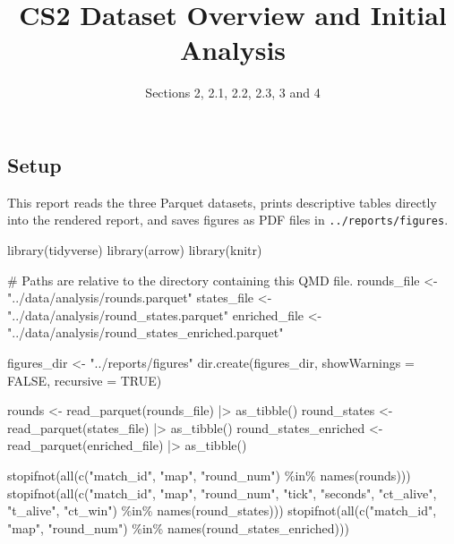 \documentclass[
  letterpaper,
  DIV=11,
  numbers=noendperiod]{scrartcl}
\title{CS2 Dataset Overview and Initial Analysis}
\subtitle{Sections 2, 2.1, 2.2, 2.3, 3 and 4}
\author{}
\date{}
\newenvironment{Shaded}{\begin{snugshade}}{\end{snugshade}}
\newcommand{\AttributeTok}[1]{\textcolor[rgb]{0.40,0.45,0.13}{#1}}
\newcommand{\CommentTok}[1]{\textcolor[rgb]{0.37,0.37,0.37}{#1}}
\newcommand{\ConstantTok}[1]{\textcolor[rgb]{0.56,0.35,0.01}{#1}}
\newcommand{\FunctionTok}[1]{\textcolor[rgb]{0.28,0.35,0.67}{#1}}
\newcommand{\NormalTok}[1]{\textcolor[rgb]{0.00,0.23,0.31}{#1}}
\newcommand{\OtherTok}[1]{\textcolor[rgb]{0.00,0.23,0.31}{#1}}
\newcommand{\SpecialCharTok}[1]{\textcolor[rgb]{0.37,0.37,0.37}{#1}}
\newcommand{\StringTok}[1]{\textcolor[rgb]{0.13,0.47,0.30}{#1}}
\begin{document}
\maketitle


\subsection{Setup}\label{setup}

This report reads the three Parquet datasets, prints descriptive tables
directly into the rendered report, and saves figures as PDF files in
\texttt{../reports/figures}.

\begin{Shaded}
\begin{Highlighting}[]
\FunctionTok{library}\NormalTok{(tidyverse)}
\FunctionTok{library}\NormalTok{(arrow)}
\FunctionTok{library}\NormalTok{(knitr)}

\CommentTok{\# Paths are relative to the directory containing this QMD file.}
\NormalTok{rounds\_file }\OtherTok{\textless{}{-}} \StringTok{"../data/analysis/rounds.parquet"}
\NormalTok{states\_file }\OtherTok{\textless{}{-}} \StringTok{"../data/analysis/round\_states.parquet"}
\NormalTok{enriched\_file }\OtherTok{\textless{}{-}} \StringTok{"../data/analysis/round\_states\_enriched.parquet"}

\NormalTok{figures\_dir }\OtherTok{\textless{}{-}} \StringTok{"../reports/figures"}
\FunctionTok{dir.create}\NormalTok{(figures\_dir, }\AttributeTok{showWarnings =} \ConstantTok{FALSE}\NormalTok{, }\AttributeTok{recursive =} \ConstantTok{TRUE}\NormalTok{)}

\NormalTok{rounds }\OtherTok{\textless{}{-}} \FunctionTok{read\_parquet}\NormalTok{(rounds\_file) }\SpecialCharTok{|\textgreater{}} \FunctionTok{as\_tibble}\NormalTok{()}
\NormalTok{round\_states }\OtherTok{\textless{}{-}} \FunctionTok{read\_parquet}\NormalTok{(states\_file) }\SpecialCharTok{|\textgreater{}} \FunctionTok{as\_tibble}\NormalTok{()}
\NormalTok{round\_states\_enriched }\OtherTok{\textless{}{-}} \FunctionTok{read\_parquet}\NormalTok{(enriched\_file) }\SpecialCharTok{|\textgreater{}} \FunctionTok{as\_tibble}\NormalTok{()}

\FunctionTok{stopifnot}\NormalTok{(}\FunctionTok{all}\NormalTok{(}\FunctionTok{c}\NormalTok{(}\StringTok{"match\_id"}\NormalTok{, }\StringTok{"map"}\NormalTok{, }\StringTok{"round\_num"}\NormalTok{) }\SpecialCharTok{\%in\%} \FunctionTok{names}\NormalTok{(rounds)))}
\FunctionTok{stopifnot}\NormalTok{(}\FunctionTok{all}\NormalTok{(}\FunctionTok{c}\NormalTok{(}\StringTok{"match\_id"}\NormalTok{, }\StringTok{"map"}\NormalTok{, }\StringTok{"round\_num"}\NormalTok{, }\StringTok{"tick"}\NormalTok{, }\StringTok{"seconds"}\NormalTok{,}
                \StringTok{"ct\_alive"}\NormalTok{, }\StringTok{"t\_alive"}\NormalTok{, }\StringTok{"ct\_win"}\NormalTok{) }\SpecialCharTok{\%in\%} \FunctionTok{names}\NormalTok{(round\_states)))}
\FunctionTok{stopifnot}\NormalTok{(}\FunctionTok{all}\NormalTok{(}\FunctionTok{c}\NormalTok{(}\StringTok{"match\_id"}\NormalTok{, }\StringTok{"map"}\NormalTok{, }\StringTok{"round\_num"}\NormalTok{) }\SpecialCharTok{\%in\%}
                \FunctionTok{names}\NormalTok{(round\_states\_enriched)))}


\end{Highlighting}
\end{Shaded}
\end{document}
